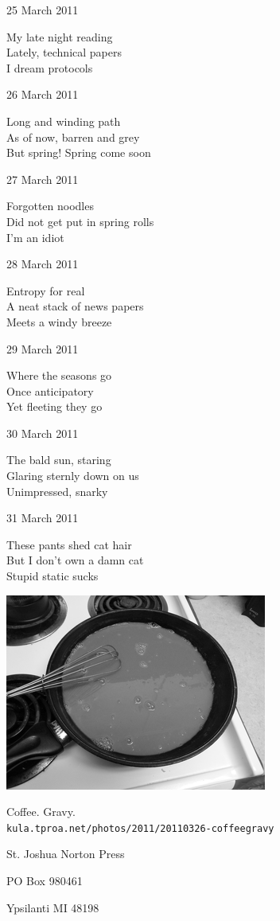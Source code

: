 \documentclass[12pt]{article}
\begin{document}
\newpage

25 March 2011

My late night reading \\
Lately, technical papers \\
I dream protocols

26 March 2011

Long and winding path \\
As of now, barren and grey \\
But spring! Spring come soon

27 March 2011

Forgotten noodles \\
Did not get put in spring rolls \\
I'm an idiot

28 March 2011

Entropy for real \\
A neat stack of news papers \\
Meets a windy breeze

29 March 2011

Where the seasons go \\
Once anticipatory \\
Yet fleeting they go

30 March 2011

The bald sun, staring \\
Glaring sternly down on us \\
Unimpressed, snarky

31 March 2011

These pants shed cat hair \\
But I don't own a damn cat \\
Stupid static sucks

\newpage

\begin{center}
\includegraphics{coffee-gravy.png}

Coffee. Gravy. \\
{\tt kula.tproa.net/photos/2011/20110326-coffeegravy }
\end{center}



\newpage

\thispagestyle{empty}
\vspace*{12cm}
\begin{sideways}
\Large{St. Joshua Norton Press}
\end{sideways}
\begin{sideways}
\Large{PO Box 980461}
\end{sideways}
\begin{sideways}
\Large{Ypsilanti MI 48198}
\end{sideways}
\end{document}
